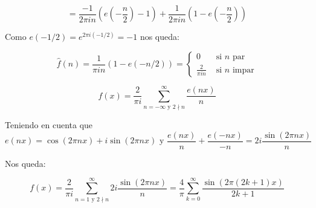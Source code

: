 \begin{problem}[3]
	$$ = \frac{-1}{2 \pi i n}\left( e\left( -\frac{n}{2} \right) -1 \right) + \frac{1}{2 \pi i n}\left(1 - e\left( -\frac{n}{2} \right) \right)$$

	Como $e(-1/2) = e^{2 \pi i (-1/2)} = -1$ nos queda:

	$$ \hat{f}(n) = \frac{1}{\pi i n} (1 - e(-n/2)) = \begin{cases}
	0 & \mbox{ si } n\text{ par} \\
	\frac{2}{\pi i n} & \mbox{ si } n \text{ impar}
	\end{cases} $$


	$$ f(x) = \frac{2}{\pi i} \sum\limits^{\infty}_{n = -\infty \text{ y } 2 \nmid n} \frac{e(nx)}{n} $$

	Teniendo en cuenta que
	\[e(nx) = \cos(2 	\pi n x) + i \sin(2 \pi n x)\text{ y }\frac{e(nx)}{n} + \frac{e(-nx)}{-n} = 2i \frac{\sin(2\pi n x)}{n}\]

	Nos queda:

	$$ f(x)= \frac{2}{\pi i} \sum\limits^{\infty}_{n = 1\text{ y } 2 \nmid n}  2i\frac{\sin (2 \pi n x)}{n} = \frac{4}{\pi} \sum^{\infty}_{k=0} \frac{\sin(2 \pi (2 k + 1) x)}{2k + 1} $$

\end{problem}

